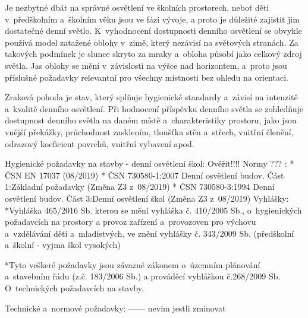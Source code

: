 Je nezbytné dbát na správné osvětlení ve školních prostorech, neboť děti v~předškolním a~školním věku jsou ve fázi vývoje,
a proto je důležité zajistit jim dostatečné denní světlo.
K~vyhodnocení dostupnosti denního osvětlení se obvykle používá model zatažené oblohy v~zimě, který nezávisí na světových stranách.
Za takových podmínek je slunce skryto za mraky a~obloha působí jako celkový zdroj světla.
Jas oblohy se mění v~závislosti na výšce nad horizontem, a~proto jsou příslušné požadavky relevantní pro všechny místnosti bez ohledu na orientaci.

Zraková pohoda je stav, který splňuje hygienické standardy a~závisí na intenzitě a~kvalitě denního osvětlení.
Při hodnocení příspěvku denního světla se zohledňuje dostupnost denního světla na daném místě a~charakteristiky
prostoru, jako jsou vnější překážky, průchodnost zasklením, tloušťka stěn a~střech, vnitřní členění, odrazový
koeficient povrchů, vnitřní vybavení apod.

\secc Hygienické požadavky na stavby - denní osvětlení škol:
Ověřit!!!! Normy ??? :
\begitems
* ČSN EN 17037 (08/2019)
* ČSN 730580-1:2007 Denní osvětlení budov. Část 1:Základní požadavky (Změna Z3 z~08/2019)
* ČSN 730580-3:1994 Denní osvětlení budov. Část 3:Denní osvětlení škol (Změna Z3 z~08/2019)
\medskip
{\sbf Vyhlášky:}
\medskip
*Vyhláška 465/2016 Sb. kterou se mění vyhláška č. 410/2005 Sb., o~hygienických požadavcích na prostory a
provoz zařízení a~provozoven pro výchovu a~vzdělávání dětí a~mladistvých, ve znění vyhlášky č. 343/2009 Sb.
(předškolní a~školní - vyjma škol vysokých)

*Tyto veškeré požadavky jsou závazné zákonem o~územním plánování a~stavebním řádu (z.č. 183/2006 Sb.) a
prováděcí vyhláškou č.268/2009 Sb. O~technických požadavcích na stavby.
\enditems

\secc Technické a~normové požadavky:   ------ nevim jestli zminovat

